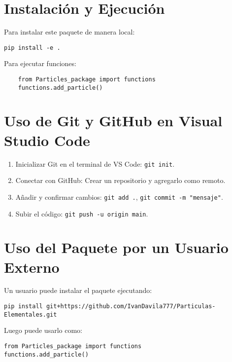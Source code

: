 \documentclass{article}
\begin{document}
\section{Instalación y Ejecución}
Para instalar este paquete de manera local:

\begin{verbatim}
pip install -e .
\end{verbatim}

Para ejecutar funciones:

\begin{verbatim}
    from Particles_package import functions
    functions.add_particle()
\end{verbatim}

\section{Uso de Git y GitHub en Visual Studio Code}
\begin{enumerate}
    \item Inicializar Git en el terminal de VS Code: \texttt{git init}.
    \item Conectar con GitHub: Crear un repositorio y agregarlo como remoto.
    \item Añadir y confirmar cambios: \texttt{git add .}, \texttt{git commit -m "mensaje"}.
    \item Subir el código: \texttt{git push -u origin main}.
\end{enumerate}

\section{Uso del Paquete por un Usuario Externo}
Un usuario puede instalar el paquete ejecutando:

\begin{verbatim}
pip install git+https://github.com/IvanDavila777/Particulas-Elementales.git
\end{verbatim}

Luego puede usarlo como:

\begin{verbatim}
from Particles_package import functions
functions.add_particle()
\end{verbatim}
\end{document}
